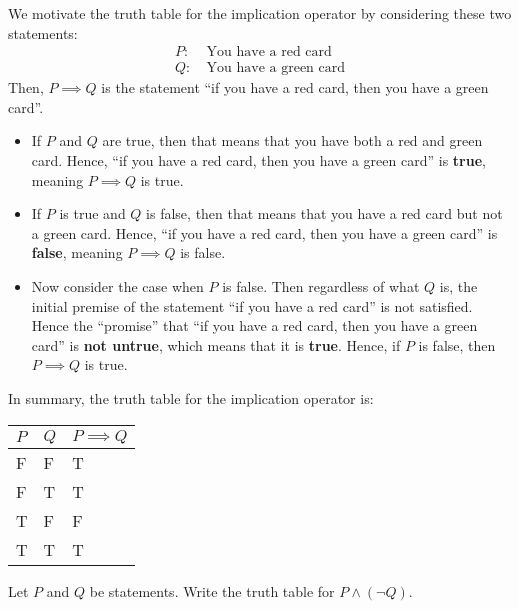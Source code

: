 We motivate the truth table for the implication operator by considering these two statements:
\begin{align*}
    P: &\ \text{You have a red card}\\
    Q: &\ \text{You have a green card}
\end{align*}
Then, $P \implies Q$ is the statement ``if you have a red card, then you have a green card''.
\begin{itemize}
    \item If $P$ and $Q$ are true, then that means that you have both a red and green card. Hence, ``if you have a red card, then you have a green card'' is \textbf{true}, meaning $P \implies Q$ is true.
    \item If $P$ is true and $Q$ is false, then that means that you have a red card but not a green card. Hence, ``if you have a red card, then you have a green card'' is \textbf{false}, meaning $P \implies Q$ is false.
    \item Now consider the case when $P$ is false. Then regardless of what $Q$ is, the initial premise of the statement ``if you have a red card'' is not satisfied. Hence the ``promise'' that ``if you have a red card, then you have a green card'' is \textbf{not untrue}, which means that it is \textbf{true}. Hence, if $P$ is false, then $P \implies Q$ is true.
\end{itemize}
In summary, the truth table for the implication operator is:
\begin{table}[h]
    \centering
    \begin{tabular}{|l|l||l|}
        \hline
        $P$ & $Q$ & $P\implies Q$ \\ \hline
        F   & F   & T             \\ \hline
        F   & T   & T             \\ \hline
        T   & F   & F             \\ \hline
        T   & T   & T             \\ \hline
    \end{tabular}
\end{table}

\begin{exercise}
    Let $P$ and $Q$ be statements. Write the truth table for $P \land (\lnot Q)$.
\end{exercise}

